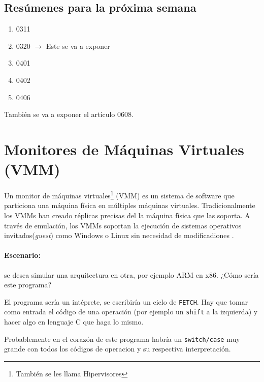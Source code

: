\documentclass[12pt, times]{simauth}
\begin{document}
\subsection{Resúmenes para la próxima semana}
\begin{enumerate}
    \item 0311
    \item 0320 $\rightarrow$  Este se va a exponer
    \item 0401
    \item 0402
    \item 0406
\end{enumerate}
También se va a exponer el artículo 0608.

\newpage
\section{Monitores de Máquinas Virtuales (VMM)}
Un monitor de máquinas virtuales\footnote{También se les llama Hipervisores} (VMM) es un sistema de software que particiona una máquina física en múltiples máquinas virtuales. Tradicionalmente los VMMs han creado réplicas precisas del la máquina física que las soporta. A través de emulación, los VMMs soportan la ejecución de sistemas operativos invitados(\emph{guest}) como Windows o Linux sin necesidad de modificadiones \cite{whitaker}.


\paragraph{Escenario:}
se desea simular una arquitectura en otra, por ejemplo ARM en x86. ¿Cómo sería este programa? 

El programa sería un intéprete, se escribiría un ciclo de \texttt{FETCH}. Hay que tomar como entrada el código de una operación (por ejemplo un \texttt{shift} a la izquierda) y hacer algo  en lenguaje C que haga lo mismo.

Probablemente en el corazón de este programa habría un \texttt{switch/case} muy grande con todos los códigos de operacion y su respectiva interpretación.


\begin{algorithm}[H]
\DontPrintSemicolon
\end{algorithm}
\end{document}
